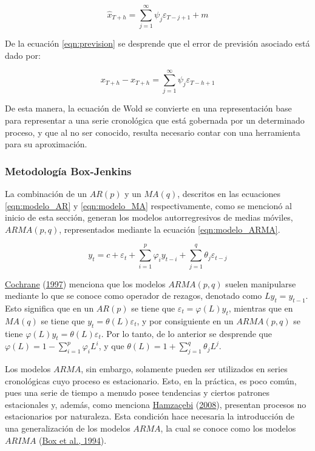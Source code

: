 \documentclass[
]{article}
\begin{document}
\begin{equation}
\label{eqn:prevision}
\hat x_{T+h}=\sum_{j=1}^{\infty} \psi_j \varepsilon_{T-j+1}+m
\end{equation}

De la ecuación \ref{eqn:prevision} se desprende que el error de
previsión asociado está dado por:

\begin{equation}
\label{eqn:error_prevision}
x_{T+h}- \hat x_{T+h}=\sum_{j=1}^{\infty} \psi_j \varepsilon_{T-h+1}
\end{equation}

De esta manera, la ecuación de Wold se convierte en una representación
base para representar a una serie cronológica que está gobernada por un
determinado proceso, y que al no ser conocido, resulta necesario contar
con una herramienta para su aproximación.

\subsubsection{Metodología Box-Jenkins}

La combinación de un \(AR(p)\) y un \(MA(q)\), descritos en las
ecuaciones \ref{eqn:modelo_AR} y \ref{eqn:modelo_MA} respectivamente,
como se mencionó al inicio de esta sección, generan los modelos
autorregresivos de medias móviles, \(ARMA(p,q)\), representados mediante
la ecuación \ref{eqn:modelo_ARMA}.

\begin{equation}
\label{eqn:modelo_ARMA}
y_t=c+\varepsilon_t+\sum_{i=1}^p \varphi_iy_{t-i}+\sum_{j=1}^q \theta_j \varepsilon_{t-j}
\end{equation}

\protect\hyperlink{ref-Cochrane}{Cochrane}
(\protect\hyperlink{ref-Cochrane}{1997}) menciona que los modelos
\(ARMA(p,q)\) suelen manipularse mediante lo que se conoce como operador
de rezagos, denotado como \(Ly_t=y_{t-1}\). Esto significa que en un
\(AR(p)\) se tiene que \(\varepsilon_t=\varphi(L)y_t\), mientras que en
\(MA(q)\) se tiene que \(y_t=\theta(L)\varepsilon_t\), y por
consiguiente en un \(ARMA(p,q)\) se tiene
\(\varphi(L)y_t=\theta(L)\varepsilon_t\). Por lo tanto, de lo anterior
se desprende que \(\varphi(L)=1-\sum_{i=1}^p \varphi_iL^i\), y que
\(\theta(L)=1+\sum_{j=1}^q\theta_jL^j\).

Los modelos \(ARMA\), sin embargo, solamente pueden ser utilizados en
series cronológicas cuyo proceso es estacionario. Esto, en la práctica,
es poco común, pues una serie de tiempo a menudo posee tendencias y
ciertos patrones estacionales y, además, como menciona
\protect\hyperlink{ref-Hamzacebi}{Hamzaçebi}
(\protect\hyperlink{ref-Hamzacebi}{2008}), presentan procesos no
estacionarios por naturaleza. Esta condición hace necesaria la
introducción de una generalización de los modelos \(ARMA\), la cual se
conoce como los modelos \(ARIMA\)
(\protect\hyperlink{ref-box-jenkins}{Box et al., 1994}).
\end{document}
